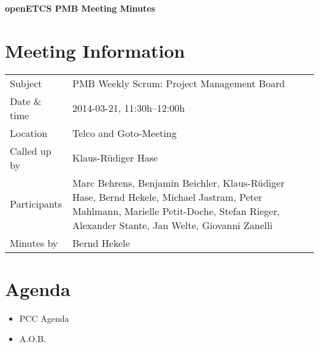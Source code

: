 \documentclass[a4paper, 11pt]{article}
\begin{document}
{\begin{center}\huge\bf openETCS PMB Meeting Minutes\end{center}}
\section{Meeting Information}

\renewcommand{\arraystretch}{1.5}
\begin{supertabular}{m{.2\textwidth}m{.8\textwidth}}
Subject & PMB Weekly Scrum: Project Management Board\\
Date \& time & 2014-03-21, 11:30h--12:00h\\
Location & Telco and Goto-Meeting\\
Called up by & Klaus-R\"udiger Hase\\
Participants &
Marc Behrens,
Benjamin Beichler,
Klaus-R\"udiger Hase,
Bernd Hekele,
Michael Jastram,
Peter Mahlmann,
Marielle Petit-Doche,
Stefan Rieger,
Alexander Stante,
Jan Welte,
Giovanni Zanelli
\\

Minutes by & Bernd Hekele\\

\end{supertabular}
\renewcommand{\arraystretch}{1.0}


\section{{Agenda}}

\begin{itemize}
\item PCC Agenda
\item A.O.B.
\end{itemize}
\end{document}

